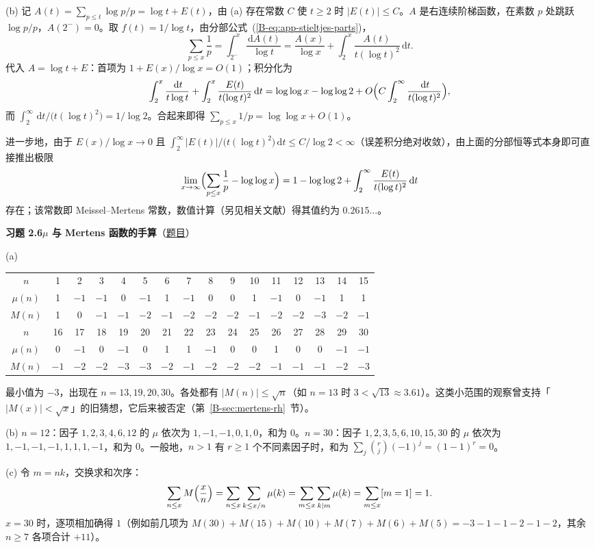 \documentclass[11pt,a4paper]{article}
\newcommand{\dd}{\,\mathrm{d}}
\newcommand{\bref}[1]{\ref*{B-#1}}
\newcommand{\Sol}[2]{%
  \par\addvspace{1.2em}\noindent
  \hypertarget{s:#1}{}\textbf{习题 #1\quad #2}\hfill{\small（\hyperlink{q:#1}{题目}）}\par
  \nopagebreak\smallskip}
\begin{document}
(b) 记 $A(t)=\sum_{p\le t}\log p/p=\log t+E(t)$，由 (a) 存在常数 $C$ 使 $t\ge2$ 时 $|E(t)|\le C$。$A$ 是右连续阶梯函数，在素数 $p$ 处跳跃 $\log p/p$，$A(2^-)=0$。取 $f(t)=1/\log t$，由分部公式~(\bref{eq:app-stieltjes-parts})，
\[
  \sum_{p\le x}\frac1p=\int_{2^-}^x\frac{\dd A(t)}{\log t}=\frac{A(x)}{\log x}+\int_2^x\frac{A(t)}{t(\log t)^2}\dd t .
\]
代入 $A=\log t+E$：首项为 $1+E(x)/\log x=O(1)$；积分化为
\[
  \int_2^x\frac{\dd t}{t\log t}+\int_2^x\frac{E(t)}{t(\log t)^2}\dd t=\log\log x-\log\log2+O\Bigl(C\int_2^\infty\frac{\dd t}{t(\log t)^2}\Bigr),
\]
而 $\int_2^\infty\dd t/\bigl(t(\log t)^2\bigr)=1/\log2$。合起来即得 $\sum_{p\le x}1/p=\log\log x+O(1)$。

进一步地，由于 $E(x)/\log x\to0$ 且 $\int_2^\infty|E(t)|/\bigl(t(\log t)^2\bigr)\dd t\le C/\log2<\infty$（误差积分绝对收敛），由上面的分部恒等式本身即可直接推出极限
\[
  \lim_{x\to\infty}\Bigl(\sum_{p\le x}\frac1p-\log\log x\Bigr)=1-\log\log2+\int_2^\infty\frac{E(t)}{t(\log t)^2}\dd t
\]
存在；该常数即 Meissel--Mertens 常数，数值计算（另见相关文献）得其值约为 $0.2615\ldots$。

\Sol{2.6}{$\mu$ 与 Mertens 函数的手算}
(a)
\begin{center}
\small
\begin{tabular}{@{}c*{15}{c}@{}}
\toprule
$n$ & 1&2&3&4&5&6&7&8&9&10&11&12&13&14&15\\
$\mu(n)$ & 1&$-1$&$-1$&0&$-1$&1&$-1$&0&0&1&$-1$&0&$-1$&1&1\\
$M(n)$ & 1&0&$-1$&$-1$&$-2$&$-1$&$-2$&$-2$&$-2$&$-1$&$-2$&$-2$&$-3$&$-2$&$-1$\\
\midrule
$n$ & 16&17&18&19&20&21&22&23&24&25&26&27&28&29&30\\
$\mu(n)$ & 0&$-1$&0&$-1$&0&1&1&$-1$&0&0&1&0&0&$-1$&$-1$\\
$M(n)$ & $-1$&$-2$&$-2$&$-3$&$-3$&$-2$&$-1$&$-2$&$-2$&$-2$&$-1$&$-1$&$-1$&$-2$&$-3$\\
\bottomrule
\end{tabular}
\end{center}
最小值为 $-3$，出现在 $n=13,19,20,30$。各处都有 $|M(n)|\le\sqrt n$（如 $n=13$ 时 $3<\sqrt{13}\approx3.61$）。这类小范围的观察曾支持「$|M(x)|<\sqrt x$」的旧猜想，它后来被否定（第~\bref{sec:mertens-rh}~节）。

(b) $n=12$：因子 $1,2,3,4,6,12$ 的 $\mu$ 依次为 $1,-1,-1,0,1,0$，和为 $0$。$n=30$：因子 $1,2,3,5,6,10,15,30$ 的 $\mu$ 依次为 $1,-1,-1,-1,1,1,1,-1$，和为 $0$。一般地，$n>1$ 有 $r\ge1$ 个不同素因子时，和为 $\sum_j\binom rj(-1)^j=(1-1)^r=0$。

(c) 令 $m=nk$，交换求和次序：
\[
  \sum_{n\le x}M\Bigl(\frac xn\Bigr)=\sum_{n\le x}\sum_{k\le x/n}\mu(k)=\sum_{m\le x}\sum_{k\mid m}\mu(k)=\sum_{m\le x}[m=1]=1 .
\]
$x=30$ 时，逐项相加确得 $1$（例如前几项为 $M(30)+M(15)+M(10)+M(7)+M(6)+M(5)=-3-1-1-2-1-2$，其余 $n\ge7$ 各项合计 $+11$）。
\end{document}
